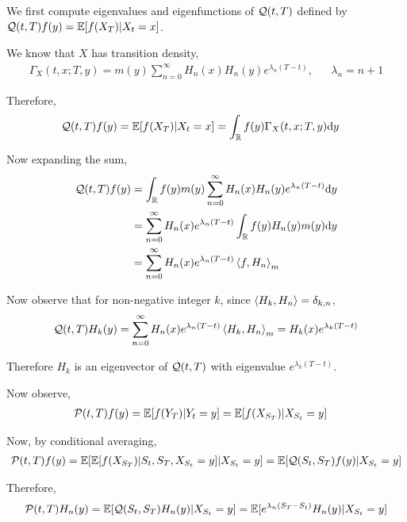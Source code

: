 \begin{solution}[Solution]
    We first compute eigenvalues and eigenfunctions of \( \mathcal{Q}(t,T) \) defined by \( \mathcal{Q}(t,T)f(y) =  \mathbb{E}[f(X_T)|X_t = x] \).

    We know that \( X \) has transition density,
    \begin{align*}
        \Gamma_X(t,x;T,y) = m(y) \sum_{n=0}^{\infty}H_n(x)H_n(y)e^{\lambda_n (T-t)}, && \lambda_n = n+1
    \end{align*}

    Therefore,
    \begin{align*}
        \mathcal{Q}(t,T)f(y) &= \mathbb{E}[f(X_T)|X_t = x] 
        = \int_{\mathbb{R}} f(y) \Gamma_X(t,x;T,y) \mathrm{d} y
    \end{align*}

    Now expanding the sum,
    \begin{align*}    
        \mathcal{Q}(t,T)f(y) &= \int_{\mathbb{R}} f(y) m(y)\sum_{n=0}^\infty H_n(x)H_n(y) e^{\lambda_n (T-t)} \mathrm{d} y 
        \\&= \sum_{n=0}^{\infty} H_n(x)e^{\lambda_n (T-t)} \int_{\mathbb{R}} f(y) H_n(y) m(y) \mathrm{d} y
        \\&= \sum_{n=0}^{\infty} H_n(x) e^{\lambda_n (T-t)} \left\langle f,H_n \right\rangle_m
    \end{align*}

    Now observe that for non-negative integer \( k \), since \( \left\langle H_k,H_n \right\rangle = \delta_{k,n} \),
    \begin{align*}
        \mathcal{Q}(t,T) H_k(y) = \sum_{n=0}^{\infty} H_n(x) e^{\lambda_n (T-t)} \left\langle H_k,H_n \right\rangle_m
        = H_k(x)e^{\lambda_k (T-t)}
    \end{align*}

    Therefore \( H_k \) is an eigenvector of \( \mathcal{Q}(t,T) \) with eigenvalue \( e^{\lambda_k (T-t)} \).

    Now observe,
    \begin{align*}
        \mathcal{P}(t,T)f(y) &= \mathbb{E}[f(Y_T) | Y_t = y]
        = \mathbb{E}[f(X_{S_T})|X_{S_t}=y]
    \end{align*}

    Now, by conditional averaging,
    \begin{align*}
        \mathcal{P}(t,T)f(y) = \mathbb{E}[\mathbb{E}[f(X_{S_T}) | S_t,S_T, X_{S_t} = y] | X_{S_t}= y]
        = \mathbb{E}[\mathcal{Q}(S_t,S_T)f(y) | X_{S_t} =y ]
    \end{align*}
    
    Therefore,
    \begin{align*}
        \mathcal{P}(t,T)H_n(y) 
        = \mathbb{E}[\mathcal{Q}(S_t,S_T) H_n(y) | X_{S_t} = y]
        = \mathbb{E}[e^{\lambda_n (S_T-S_t)} H_n(y) | X_{S_t} = y]
    \end{align*}
    

\end{solution}
